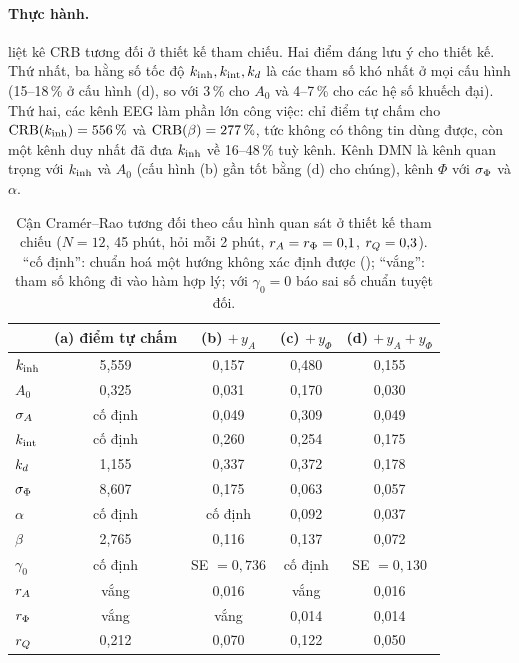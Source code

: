 \paragraph{Thực hành.}  liệt kê CRB tương đối ở thiết kế tham chiếu. Hai điểm đáng lưu ý cho thiết kế. Thứ nhất, ba hằng số tốc độ $k_{\mathrm{inh}},k_{\mathrm{int}},k_{d}$ là các tham số khó nhất ở mọi cấu hình (15--18\,\% ở cấu hình (d), so với 3\,\% cho $A_0$ và 4--7\,\% cho các hệ số khuếch đại). Thứ hai, các kênh EEG làm phần lớn công việc: chỉ điểm tự chấm cho $\mathrm{CRB}(k_{\mathrm{inh}})=556\,\%$ và $\mathrm{CRB}(\beta)=277\,\%$, tức không có thông tin dùng được, còn một kênh duy nhất đã đưa $k_{\mathrm{inh}}$ về 16--48\,\% tuỳ kênh. Kênh DMN là kênh quan trọng với $k_{\mathrm{inh}}$ và $A_0$ (cấu hình (b) gần tốt bằng (d) cho chúng), kênh $\Phi$ với $\sigma_{\Phi}$ và $\alpha$.

\begin{table}[t]
\centering\small
\caption{Cận Cramér--Rao tương đối theo cấu hình quan sát ở thiết kế tham chiếu ($N=12$, 45 phút, hỏi mỗi 2 phút, $r_{A}=r_{\Phi}=0{,}1$, $r_{Q}=0{,}3$). ``cố định'': chuẩn hoá một hướng không xác định được (); ``vắng'': tham số không đi vào hàm hợp lý; với $\gamma_0=0$ báo sai số chuẩn tuyệt đối.}
\label{tab:crb}
\begin{tabular}{lcccc}
\toprule
 & (a) điểm tự chấm & (b) $+\,y_A$ & (c) $+\,y_\Phi$ & (d) $+\,y_A+y_\Phi$ \\
\midrule
$k_{\mathrm{inh}}$   & 5,559 & 0,157 & 0,480 & 0,155 \\
$A_0$     & 0,325 & 0,031 & 0,170 & 0,030 \\
$\sigma_{A}$     & cố định & 0,049 & 0,309 & 0,049 \\
$k_{\mathrm{int}}$   & cố định & 0,260 & 0,254 & 0,175 \\
$k_{d}$     & 1,155 & 0,337 & 0,372 & 0,178 \\
$\sigma_{\Phi}$   & 8,607 & 0,175 & 0,063 & 0,057 \\
$\alpha$  & cố định & cố định & 0,092 & 0,037 \\
$\beta$   & 2,765 & 0,116 & 0,137 & 0,072 \\
$\gamma_0$& cố định & SE $=0{,}736$ & cố định & SE $=0{,}130$ \\
$r_{A}$     & vắng & 0,016 & vắng & 0,016 \\
$r_{\Phi}$   & vắng & vắng & 0,014 & 0,014 \\
$r_{Q}$     & 0,212 & 0,070 & 0,122 & 0,050 \\
\bottomrule
\end{tabular}
\end{table}

